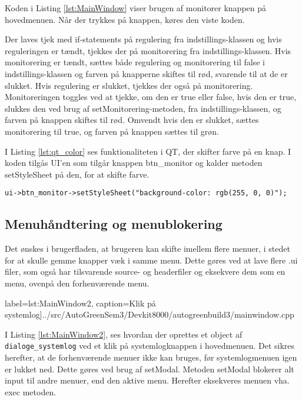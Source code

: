 Koden i Listing \ref{lst:MainWindow} viser brugen af monitorer knappen på hovedmenuen. Når der trykkes på knappen, køres den viste koden.

Der laves tjek med if-statements på regulering fra indstillings-klassen og hvis reguleringen er tændt, tjekkes der på monitorering fra indstillings-klassen. Hvis monitorering er tændt, sættes både regulering og monitorering til false i indstillings-klassen og farven på knapperne skiftes til rød, svarende til at de er slukket. Hvis regulering er slukket, tjekkes der også på monitorering. Monitoreringen toggles ved at tjekke, om den er true eller false, hvis den er true, slukkes den ved brug af setMonitorering-metoden, fra indstillings-klassen, og farven på knappen skiftes til rød. Omvendt hvis den er slukket, sættes monitorering til true, og farven på knappen sættes til grøn. 

I Listing \ref{lst:qt_color} ses funktionaliteten i QT, der skifter farve på en knap. I koden tilgås UI'en som tilgår knappen btn\_monitor og kalder metoden setStyleSheet på den, for at skifte farve.

\begin{lstlisting}[label=lst:qt_color,caption=Farveskifte i QT.]
	ui->btn_monitor->setStyleSheet("background-color: rgb(255, 0, 0)");
\end{lstlisting}

\subsection{Menuhåndtering og menublokering}

Det ønskes i brugerfladen, at brugeren kan skifte imellem flere menuer, i stedet for at skulle gemme knapper væk i samme menu. Dette gøres ved at lave flere .ui filer, som også har tilsvarende source- og headerfiler og eksekvere dem som en menu, ovenpå den forhenværende menu.

 label=lst:MainWindow2, caption=Klik på systemlog]{../src/AutoGreenSem3/Devkit8000/autogreenbuild3/mainwindow.cpp}

I Listing \ref{lst:MainWindow2}, ses hvordan der oprettes et object af \texttt{dialoge\_systemlog} ved et klik på systemlogknappen i hovedmenuen. Det sikres herefter, at de forhenværende menuer ikke kan bruges, før systemlogmenuen igen er lukket ned. Dette gøres ved brug af setModal. Metoden setModal blokerer alt input til andre menuer, end den aktive menu. Herefter eksekveres menuen vha. exec metoden.

